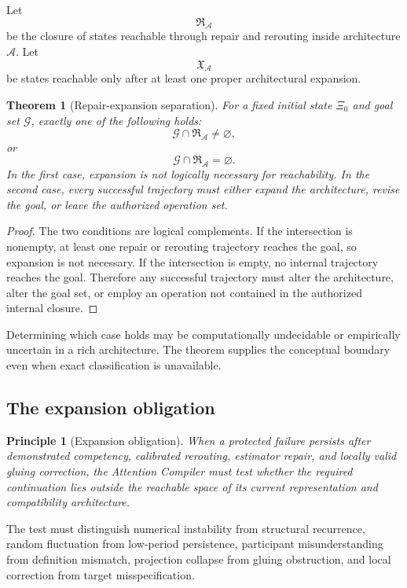 \documentclass[11pt]{article}
\newtheorem{theorem}[definition]{Theorem}
\newtheorem{principle}[definition]{Principle}
\theoremstyle{definition}
\begin{document}
Let
\[
\mathfrak R_{\mathcal A}
\]
be the closure of states reachable through repair and rerouting inside architecture \(\mathcal A\). Let
\[
\mathfrak X_{\mathcal A}
\]
be states reachable only after at least one proper architectural expansion.

\begin{theorem}[Repair-expansion separation]
For a fixed initial state \(\Xi_0\) and goal set \(\mathcal G\), exactly one of the following holds:
\[
\mathcal G
\cap
\mathfrak R_{\mathcal A}
\neq
\varnothing,
\]
or
\[
\mathcal G
\cap
\mathfrak R_{\mathcal A}
=
\varnothing.
\]
In the first case, expansion is not logically necessary for reachability. In the second case, every successful trajectory must either expand the architecture, revise the goal, or leave the authorized operation set.
\end{theorem}

\begin{proof}
The two conditions are logical complements. If the intersection is nonempty, at least one repair or rerouting trajectory reaches the goal, so expansion is not necessary. If the intersection is empty, no internal trajectory reaches the goal. Therefore any successful trajectory must alter the architecture, alter the goal set, or employ an operation not contained in the authorized internal closure.
\end{proof}

Determining which case holds may be computationally undecidable or empirically uncertain in a rich architecture. The theorem supplies the conceptual boundary even when exact classification is unavailable.

\subsection{The expansion obligation}

\begin{principle}[Expansion obligation]
When a protected failure persists after demonstrated competency, calibrated rerouting, estimator repair, and locally valid gluing correction, the Attention Compiler must test whether the required continuation lies outside the reachable space of its current representation and compatibility architecture.
\end{principle}

The test must distinguish numerical instability from structural recurrence, random fluctuation from low-period persistence, participant misunderstanding from definition mismatch, projection collapse from gluing obstruction, and local correction from target misspecification.
\end{document}
